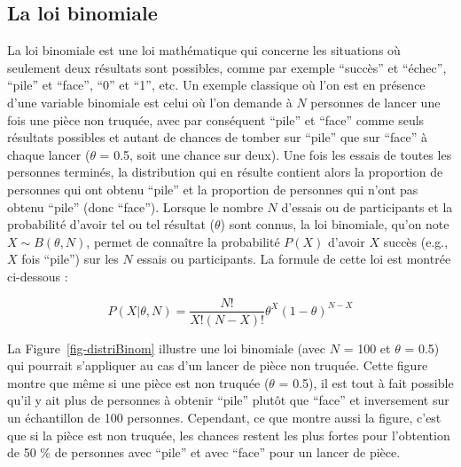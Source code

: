 \documentclass[
  letterpaper,
]{book}
\begin{document}
\subsection{La loi binomiale}\label{la-loi-binomiale}

La loi binomiale est une loi mathématique qui concerne les situations où
seulement deux résultats sont possibles, comme par exemple ``succès'' et
``échec'', ``pile'' et ``face'', ``0'' et ``1'', etc. Un exemple
classique où l'on est en présence d'une variable binomiale est celui où
l'on demande à \(N\) personnes de lancer une fois une pièce non truquée,
avec par conséquent ``pile'' et ``face'' comme seuls résultats possibles
et autant de chances de tomber sur ``pile'' que sur ``face'' à chaque
lancer (\(\theta\) = 0.5, soit une chance sur deux). Une fois les essais
de toutes les personnes terminés, la distribution qui en résulte
contient alors la proportion de personnes qui ont obtenu ``pile'' et la
proportion de personnes qui n'ont pas obtenu ``pile'' (donc ``face'').
Lorsque le nombre \(N\) d'essais ou de participants et la probabilité
d'avoir tel ou tel résultat (\(\theta\)) sont connus, la loi binomiale,
qu'on note \(X \sim B(\theta, N)\), permet de connaître la probabilité
\(P(X)\) d'avoir \(X\) succès (e.g., \(X\) fois ``pile'') sur les \(N\)
essais ou participants. La formule de cette loi est montrée ci-dessous :

\[P(X | \theta, N) = \frac{N!}{X!(N-X)!}\theta^X(1-\theta)^{N-X}\]

La Figure~\ref{fig-distriBinom} illustre une loi binomiale (avec \(N\) =
100 et \(\theta\) = 0.5) qui pourrait s'appliquer au cas d'un lancer de
pièce non truquée. Cette figure montre que même si une pièce est non
truquée (\(\theta\) = 0.5), il est tout à fait possible qu'il y ait plus
de personnes à obtenir ``pile'' plutôt que ``face'' et inversement sur
un échantillon de 100 personnes. Cependant, ce que montre aussi la
figure, c'est que si la pièce est non truquée, les chances restent les
plus fortes pour l'obtention de 50 \% de personnes avec ``pile'' et avec
``face'' pour un lancer de pièce.
\end{document}
